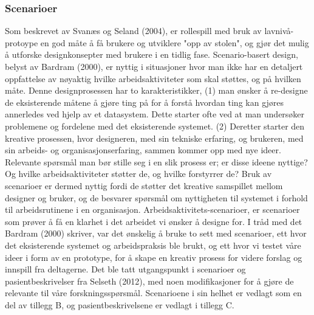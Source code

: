 \subsubsection{Scenarioer}
Som beskrevet av Svanæs og Seland (2004), er rollespill med bruk av lavnivå-protoype en god måte å få brukere og utviklere "opp av stolen", og gjør det mulig å utforske designkonsepter med brukere i en tidlig fase. Scenario-basert design, belyst av Bardram (2000), er nyttig i situasjoner hvor man ikke har en detaljert oppfattelse av nøyaktig hvilke arbeidsaktiviteter som skal støttes, og på hvilken måte. Denne designprosessen har to karakteristikker, (1) man ønsker å re-designe de eksisterende måtene å gjøre ting på for å forstå hvordan ting kan gjøres annerledes ved hjelp av et datasystem. Dette starter ofte ved at man undersøker problemene og fordelene med det eksisterende systemet. (2) Deretter starter den kreative prosessen, hvor designeren, med sin tekniske erfaring, og brukeren, med sin arbeids- og organisasjonserfaring, sammen kommer opp med nye ideer. Relevante spørsmål man bør stille seg i en slik prosess er; er disse ideene nyttige? Og hvilke arbeidsaktiviteter støtter de, og hvilke forstyrrer de? Bruk av scenarioer er dermed nyttig fordi de støtter det kreative samspillet mellom designer og bruker, og de besvarer spørsmål om nyttigheten til systemet i forhold til arbeidsrutinene i en organisasjon. Arbeidsaktivitets-scenarioer, er scenarioer som prøver å få en klarhet i det arbeidet vi ønsker å designe for. 
I tråd med det Bardram (2000) skriver, var det ønskelig å bruke to sett med scenarioer, ett hvor det eksisterende systemet og arbeidspraksis ble brukt, og ett hvor vi testet våre ideer i form av en prototype, for å skape en kreativ prosess for videre forslag og innspill fra deltagerne. Det ble tatt utgangspunkt i scenarioer og pasientbeskrivelser fra Selseth (2012)\nocite{Selseth12}, med noen modifikasjoner for å gjøre de relevante til våre forskningsspørsmål. Scenarioene i sin helhet er vedlagt som en del av tillegg B, og pasientbeskrivelsene er vedlagt i tillegg C.


